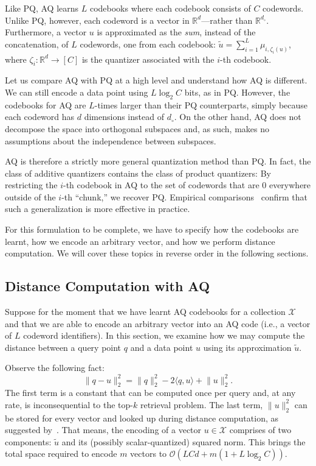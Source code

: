 Like PQ, AQ learns $L$ codebooks where each codebook consists of $C$ codewords.
Unlike PQ, however, each codeword is a vector in $\mathbb{R}^d$---rather than $\mathbb{R}^{d_\circ}$.
Furthermore, a vector $u$ is approximated as the \emph{sum}, instead of the concatenation,
of $L$ codewords, one from each codebook: $\tilde{u} = \sum_{i=1}^L \mu_{i, \zeta_i(u)}$,
where $\zeta_{i}: \mathbb{R}^d \rightarrow [C]$ is the quantizer associated with the
$i$-th codebook.

Let us compare AQ with PQ at a high level and understand how AQ is different.
We can still encode a data point using $L \log_2 C$ bits, as in PQ.
However, the codebooks for AQ are $L$-times larger than their PQ counterparts,
simply because each codeword has $d$ dimensions instead of $d_\circ$.
On the other hand, AQ does not decompose the space into orthogonal subspaces
and, as such, makes no assumptions about the independence between subspaces.

AQ is therefore a strictly more general quantization method than PQ.
In fact, the class of additive quantizers contains the class of product quantizers:
By restricting the $i$-th codebook in AQ to the set of codewords that are $0$
everywhere outside of the $i$-th ``chunk,'' we recover PQ.
Empirical comparisons~\citep{additiveQuantization,Matsui2018PQSurvey} confirm
that such a generalization is more effective in practice.

For this formulation to be complete, we have to specify how the codebooks are learnt,
how we encode an arbitrary vector, and how we perform distance computation.
We will cover these topics in reverse order in the following sections.

\subsection{Distance Computation with AQ}
Suppose for the moment that we have learnt AQ codebooks for a collection $\mathcal{X}$
and that we are able to encode an arbitrary vector into an AQ code (i.e.,
a vector of $L$ codeword identifiers). In this section, we examine how
we may compute the distance between a query point $q$ and a data point $u$
using its approximation $\tilde{u}$.

Observe the following fact:
\begin{equation*}
    \lVert q - u \rVert_2^2 = \lVert q \rVert_2^2 - 2 \langle q, u \rangle + \lVert u \rVert_2^2.
\end{equation*}
The first term is a constant that can be computed once per query and, at any rate,
is inconsequential to the top-$k$ retrieval problem. The last term, $\lVert u \rVert_2^2$
can be stored for every vector and looked up during distance computation,
as suggested by~\cite{additiveQuantization}. That means, the encoding of a vector
$u \in \mathcal{X}$ comprises of two components: $\tilde{u}$ and its (possibly scalar-quantized)
squared norm. This brings the total space required to encode $m$ vectors
to $\mathcal{O}(LCd + m (1 + L\log_2 C))$.

